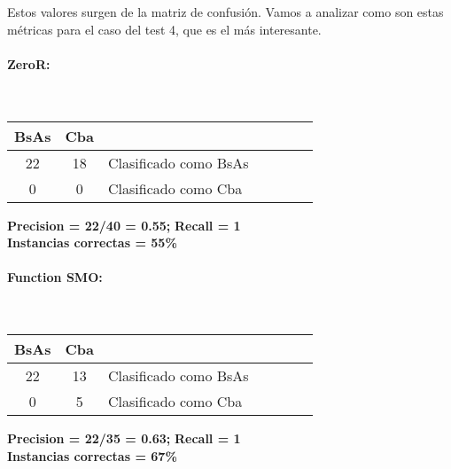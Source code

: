 
Estos valores surgen de la matriz de confusión. Vamos a analizar como son estas métricas para el caso del test 4, que es el más interesante.


\paragraph*{ZeroR:}\mbox{}\\
\begin{table}[H]
\centering
\begin{tabular}{|c|c|l|c|c|c|c|}
\hline
 BsAs & Cba &  \\ \hline
 22 &  18 &  Clasificado como BsAs \\ \hline
 0  &   0 &  Clasificado como Cba \\ \hline
\end{tabular}
\end{table}
\begin{center}
\textbf{Precision = 22/40 = 0.55;} \textbf{Recall = 1}\\
\textbf{Instancias correctas = 55\%}
\end{center}

\paragraph*{Function SMO:}\mbox{}\\
\begin{table}[H]
\centering
\begin{tabular}{|c|c|l|c|c|c|c|}
\hline
 BsAs & Cba &  \\ \hline
 22 &  13 &  Clasificado como BsAs \\ \hline
 0  &   5 &  Clasificado como Cba \\ \hline
\end{tabular}
\end{table}
\begin{center}
\textbf{Precision = 22/35 = 0.63;} \textbf{Recall = 1}\\
\textbf{Instancias correctas = 67\%}
\end{center}

